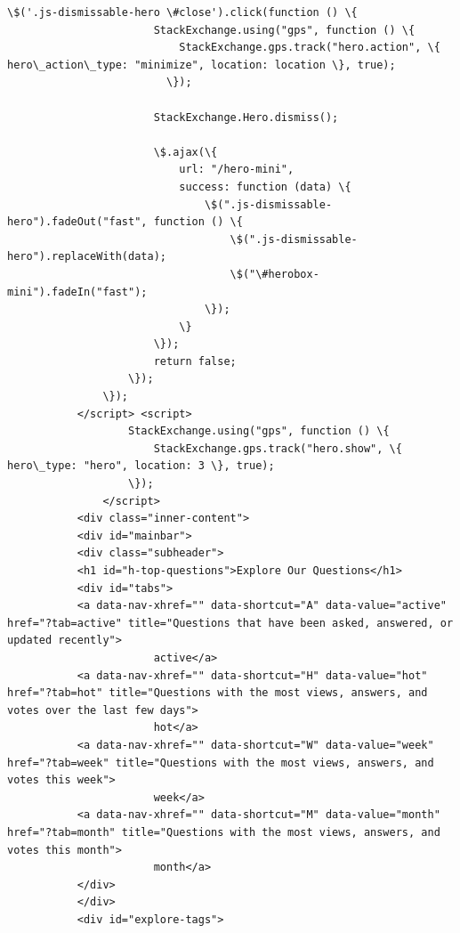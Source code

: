 \documentclass[11pt]{article}
\begin{document}
\begin{Verbatim}[commandchars=\\\{\}]
                   \$('.js-dismissable-hero \#close').click(function () \{
                       StackExchange.using("gps", function () \{
                           StackExchange.gps.track("hero.action", \{ hero\_action\_type: "minimize", location: location \}, true);
                         \});
           
                       StackExchange.Hero.dismiss();
           
                       \$.ajax(\{
                           url: "/hero-mini",
                           success: function (data) \{
                               \$(".js-dismissable-hero").fadeOut("fast", function () \{
                                   \$(".js-dismissable-hero").replaceWith(data);
                                   \$("\#herobox-mini").fadeIn("fast");
                               \});
                           \}
                       \});
                       return false;
                   \});
               \});
           </script> <script>
                   StackExchange.using("gps", function () \{
                       StackExchange.gps.track("hero.show", \{ hero\_type: "hero", location: 3 \}, true);
                   \});
               </script>
           <div class="inner-content">
           <div id="mainbar">
           <div class="subheader">
           <h1 id="h-top-questions">Explore Our Questions</h1>
           <div id="tabs">
           <a data-nav-xhref="" data-shortcut="A" data-value="active" href="?tab=active" title="Questions that have been asked, answered, or updated recently">
                       active</a>
           <a data-nav-xhref="" data-shortcut="H" data-value="hot" href="?tab=hot" title="Questions with the most views, answers, and votes over the last few days">
                       hot</a>
           <a data-nav-xhref="" data-shortcut="W" data-value="week" href="?tab=week" title="Questions with the most views, answers, and votes this week">
                       week</a>
           <a data-nav-xhref="" data-shortcut="M" data-value="month" href="?tab=month" title="Questions with the most views, answers, and votes this month">
                       month</a>
           </div>
           </div>
           <div id="explore-tags">

\end{Verbatim}
\end{document}
